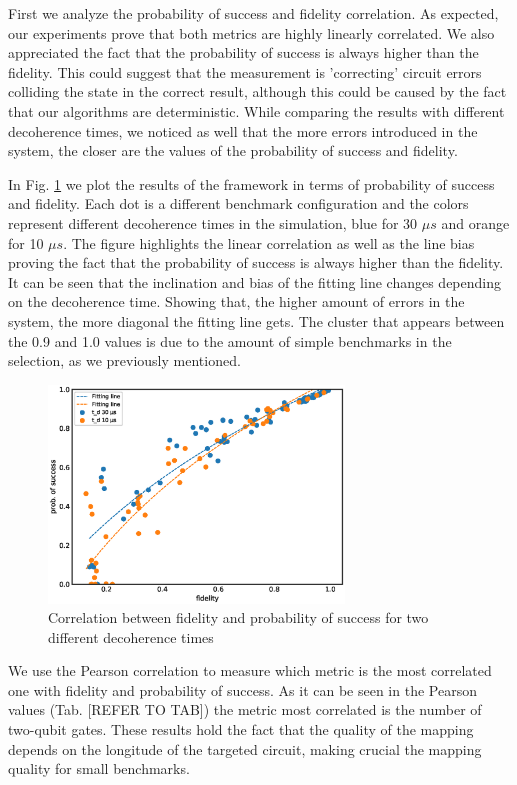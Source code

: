 First we analyze the probability of success and fidelity correlation.
As expected, our experiments prove that both metrics are highly linearly correlated.
We also appreciated the fact that the probability of success is always higher than the fidelity.
This could suggest that the measurement is 'correcting' circuit errors colliding the state in the correct result, although this could be caused by the fact that our algorithms are deterministic.
While comparing the results with different decoherence times, we noticed as well that the more errors introduced in the system, the closer are the values of the probability of success and fidelity.

In Fig. \ref{fig:orgce9917d} we plot the results of the framework in terms of probability of success and fidelity. 
Each dot is a different benchmark configuration and the colors represent different decoherence times in the simulation, blue for 30 \(\mu s\) and orange for 10 \(\mu s\).
The figure highlights the linear correlation as well as the line bias proving the fact that the probability of success is always higher than the fidelity.
It can be seen that the inclination and bias of the fitting line changes depending on the decoherence time.
Showing that, the higher amount of errors in the system, the more diagonal the fitting line gets.
The cluster that appears between the 0.9 and 1.0 values is due to the amount of simple benchmarks in the selection, as we previously mentioned.

\begin{figure}[htbp]
\centering
\includegraphics[width=0.7\textwidth]{figures/f_ps_correlation.eps}
\caption{\label{fig:orgce9917d}
Correlation between fidelity and probability of success for two different decoherence times}
\end{figure}



We use the Pearson correlation to measure which metric is the most correlated one with fidelity and probability of success.
As it can be seen in the Pearson values (Tab. [REFER TO TAB]) the metric most correlated is the number of two-qubit gates.
These results hold the fact that the quality of the mapping depends on the longitude of the targeted circuit, making crucial the mapping quality for small benchmarks.

